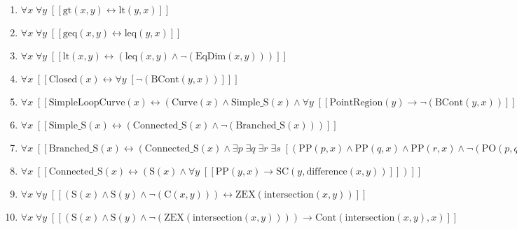 \documentclass{article}
\begin{document}
\begin{enumerate}
\item $\forall x\; \forall y\;  \left[ \left[ \textrm{gt}(x,y) \leftrightarrow \textrm{lt}(y,x) \right] \right]$
\item $\forall x\; \forall y\;  \left[ \left[ \textrm{geq}(x,y) \leftrightarrow \textrm{leq}(y,x) \right] \right]$
\item $\forall x\; \forall y\;  \left[ \left[ \textrm{lt}(x,y) \leftrightarrow \left(\textrm{leq}(x,y) \land \neg \left(\textrm{EqDim}(x,y)\right)\right) \right] \right]$
\item $\forall x\;  \left[ \left[ \textrm{Closed}(x) \leftrightarrow \forall y\;  \left[ \neg \left(\textrm{BCont}(y,x)\right) \right] \right] \right]$
\item $\forall x\;  \left[ \left[ \textrm{SimpleLoopCurve}(x) \leftrightarrow \left(\textrm{Curve}(x) \land \textrm{Simple\_S}(x) \land \forall y\;  \left[ \left[ \textrm{PointRegion}(y) \rightarrow \neg \left(\textrm{BCont}(y,x)\right) \right] \right]\right) \right] \right]$
\item $\forall x\;  \left[ \left[ \textrm{Simple\_S}(x) \leftrightarrow \left(\textrm{Connected\_S}(x) \land \neg \left(\textrm{Branched\_S}(x)\right)\right) \right] \right]$
\item $\forall x\;  \left[ \left[ \textrm{Branched\_S}(x) \leftrightarrow \left(\textrm{Connected\_S}(x) \land \exists p\; \exists q\; \exists r\; \exists s\;  \left[ \left(\textrm{PP}(p,x) \land \textrm{PP}(q,x) \land \textrm{PP}(r,x) \land \neg \left(\textrm{PO}(p,q)\right) \land \neg \left(\textrm{PO}(p,r)\right) \land \neg \left(\textrm{PO}(q,r)\right) \land \textrm{Covers}(p,s) \land \textrm{Covers}(q,s) \land \textrm{Covers}(r,s) \land \textrm{Cont}(s,p) \land \textrm{Cont}(s,q) \land \textrm{Cont}(s,r)\right) \right]\right) \right] \right]$
\item $\forall x\;  \left[ \left[ \textrm{Connected\_S}(x) \leftrightarrow \left(\textrm{S}(x) \land \forall y\;  \left[ \left[ \textrm{PP}(y,x) \rightarrow \textrm{SC}(y,\textrm{difference}(x,y)) \right] \right]\right) \right] \right]$
\item $\forall x\; \forall y\;  \left[ \left[ \left(\textrm{S}(x) \land \textrm{S}(y) \land \neg \left(\textrm{C}(x,y)\right)\right) \leftrightarrow \textrm{ZEX}(\textrm{intersection}(x,y)) \right] \right]$
\item $\forall x\; \forall y\;  \left[ \left[ \left(\textrm{S}(x) \land \textrm{S}(y) \land \neg \left(\textrm{ZEX}(\textrm{intersection}(x,y))\right)\right) \rightarrow \textrm{Cont}(\textrm{intersection}(x,y),x) \right] \right]$

\end{enumerate}
\end{document}
